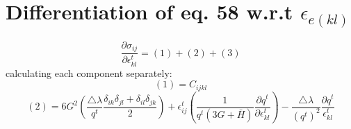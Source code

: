 \documentclass{article}
\begin{document}
\section{Differentiation of eq. 58 w.r.t $\epsilon_{e(kl)}$}
\begin{equation}
    \frac{\partial \sigma_{ij}}{\partial \epsilon^{t}_{kl}}= (1) +(2)+(3)
\end{equation}
calculating each component separately:
\begin{equation}
    (1)= C_{ijkl}
\end{equation}
\begin{equation}
    (2)= 6G^{2}(\frac{\bigtriangleup\lambda}{q^{t}}\frac{\delta_{ik}\delta_{jl}+\delta_{il}\delta_{jk}}{2}) +\epsilon^{t}_{ij}(\frac{1}{q^{t}(3G+\bar{H})}  \frac{\partial q^{t}}{\partial \epsilon^{t}_{kl}})- \frac{\bigtriangleup\lambda}{(q^{t})^{2}}\frac{\partial q^{t}}{\epsilon^{t}_{kl}}
\end{equation}
\begin{equation}
    
\end{equation}
\begin{equation}
    
\end{equation}
\begin{equation}
    
\end{equation}
\begin{equation}
    
\end{equation}
\begin{equation}
    
\end{equation}
\begin{equation}
    
\end{equation}
\begin{equation}
    
\end{equation}
\begin{equation}
    
\end{equation}
\begin{equation}
    
\end{equation}
\begin{equation}
    
\end{equation}
\end{document}
